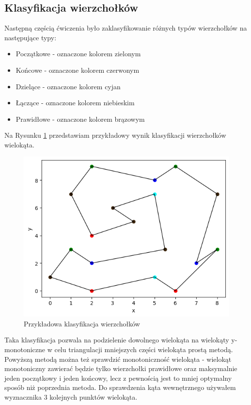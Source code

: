\documentclass[a4paper]{article}
\begin{document}
    \subsection{Klasyfikacja wierzchołków}
    Następną częścią ćwiczenia było zaklasyfikowanie różnych typów wierzchołków na następujące
    typy:
    \begin{itemize}
        \item Początkowe - oznaczone kolorem zielonym
        \item Końcowe - oznaczone kolorem czerwonym
        \item Dzielące - oznaczone kolorem cyjan
        \item Łączące - oznaczone kolorem niebieskim
        \item Prawidłowe - oznaczone kolorem brązowym 
    \end{itemize} 
    \noindent Na Rysunku \ref{fig:example_vertex_colors} przedstawiam przykładowy wynik klasyfikacji
    wierzchołków wielokąta.
    \begin{figure}[H]
        \centering
        \includegraphics{przykladowa_klasyfikacja.png}
        \caption{Przykładowa klasyfikacja wierzchołków}
        \label{fig:example_vertex_colors}
    \end{figure}
    \noindent Taka klasyfikacja pozwala na podzielenie dowolnego wielokąta na wielokąty y-monotoniczne w
    celu triangulacji mniejszych części wielokąta prostą metodą. Powyższą metodą można też sprawdzić 
    monotoniczność wielokąta - wielokąt monotoniczny zawierać będzie tylko wierzchołki prawidłowe oraz maksymalnie
    jeden początkowy i jeden końcowy, lecz z pewnością jest to mniej optymalny sposób niż poprzednia metoda. Do 
    sprawdzenia kąta wewnętrznego używałem wyznacznika 3 kolejnych punktów wielokąta.
\end{document}
